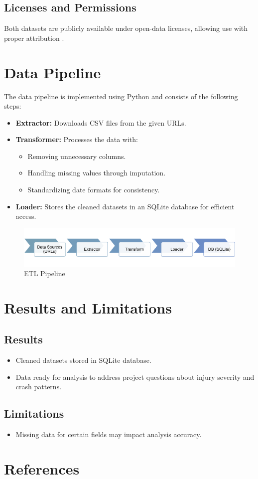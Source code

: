 \documentclass[a4paper,12pt]{article}
\begin{document}
\subsection{Licenses and Permissions}
Both datasets are publicly available under open-data licenses, allowing use with proper attribution \cite{traffic_crashes_people, traffic_crashes_vehicles}.

\section{Data Pipeline}
The data pipeline is implemented using Python and consists of the following steps:
\begin{itemize}
    \item \textbf{Extractor:} Downloads CSV files from the given URLs.
    \item \textbf{Transformer:} Processes the data with:
        \begin{itemize}
            \item Removing unnecessary columns.
            \item Handling missing values through imputation.
            \item Standardizing date formats for consistency.
        \end{itemize}
    \item \textbf{Loader:} Stores the cleaned datasets in an SQLite database for efficient access.
\end{itemize}

\begin{figure}
    \centering
    \includegraphics[width=1\linewidth]{images/Picture1.png}
    \caption{ETL Pipeline}
    \label{fig:ETL-pipeline}
\end{figure}

\section{Results and Limitations}
\subsection{Results}
\begin{itemize}
    \item Cleaned datasets stored in SQLite database.
    \item Data ready for analysis to address project questions about injury severity and crash patterns.
\end{itemize}

\subsection{Limitations}
\begin{itemize}
    \item Missing data for certain fields may impact analysis accuracy.

\end{itemize}

\section{References}


\end{document}
